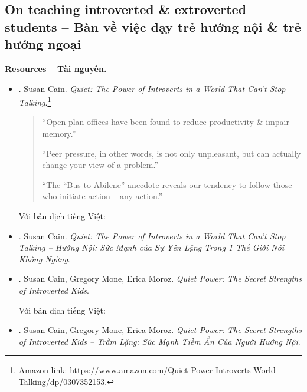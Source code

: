 \documentclass[12pt]{article}
\begin{document}
\subsection{On teaching introverted \& extroverted students -- Bàn về việc dạy trẻ hướng nội \& trẻ hướng ngoại}
\textbf{\textsf{Resources -- Tài nguyên.}}
\begin{itemize}
	\item \cite{Cain_quiet}. {\sc Susan Cain}. {\it Quiet: The Power of Introverts in a World That Can't Stop Talking}.\footnote{Amazon link: \url{https://www.amazon.com/Quiet-Power-Introverts-World-Talking/dp/0307352153}.}
	\begin{quotation}
		``Open-plan offices have been found to reduce productivity \& impair memory.''
		
		``Peer pressure, in other words, is not only unpleasant, but can actually change your view of a problem.''
		
		``The ``Bus to Abilene'' anecdote reveals our tendency to follow those who initiate action -- any action.''
	\end{quotation}
	Với bản dịch tiếng Việt:
	\item \cite{Cain_quiet_VN}. {\sc Susan Cain}. {\it Quiet: The Power of Introverts in a World That Can't Stop Talking -- Hướng Nội: Sức Mạnh của Sự Yên Lặng Trong 1 Thế Giới Nói Không Ngừng}.
	\item \cite{Cain_Mone_Moroz_quiet_power}. {\sc Susan Cain, Gregory Mone, Erica Moroz}. {\it Quiet Power: The Secret Strengths of Introverted Kids}.
	
	Với bản dịch tiếng Việt:
	\item \cite{Cain_Mone_Moroz_quiet_power_VN}. {\sc Susan Cain, Gregory Mone, Erica Moroz}. {\it Quiet Power: The Secret Strengths of Introverted Kids -- Trầm Lặng: Sức Mạnh Tiềm Ẩn Của Người Hướng Nội}.
\end{itemize}
\end{document}
